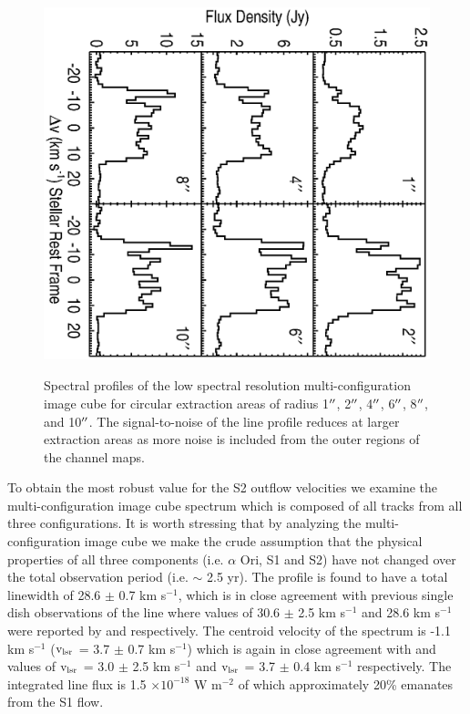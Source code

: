 \documentclass[iop]{emulateapj}
\begin{document}
\begin{figure}
\includegraphics[scale=0.75, angle=90, width=13.0cm, height=11cm, trim=20pt 50pt 20pt 40pt]{f2.eps}
\caption{Spectral profiles of the low spectral resolution multi-configuration image cube for circular extraction areas of radius 1$\mbox{$^{\prime\prime}$}$, 2$\mbox{$^{\prime\prime}$}$, 4$\mbox{$^{\prime\prime}$}$, 6$\mbox{$^{\prime\prime}$}$, 8$\mbox{$^{\prime\prime}$}$, and 10$\mbox{$^{\prime\prime}$}$. The signal-to-noise of the line profile reduces at larger extraction areas as more noise is included from the outer regions of the channel maps.}
\label{fig:fig2}
\end{figure}

To obtain the most robust value for the S2 outflow velocities we examine the multi-configuration image cube spectrum which is composed of all tracks from all three configurations. It is worth stressing that by analyzing the multi-configuration image cube we make the crude assumption that the physical properties of all three components (i.e. $\alpha$ Ori, S1 and S2) have not changed over the total observation period (i.e. $\sim$ 2.5 yr). The profile is found to have a total linewidth of 28.6 $\pm$ 0.7 km s${}^{-1}$, which is in close agreement with previous single dish observations of the line where values of 30.6 $\pm$ 2.5 km s${}^{-1}$ and 28.6 km s${}^{-1}$ were reported by \cite{1980ApJ...242L..25K} and \cite{1987ApJ...313..400H} respectively. The centroid velocity of the spectrum is  -1.1 km s${}^{-1}$ ($\rm{v_{lsr}}$ = 3.7 $\pm$ 0.7 km s${}^{-1}$) which is again in close agreement with \cite{1980ApJ...242L..25K} and \cite{1987ApJ...313..400H} values of $\rm{v_{lsr}}$ = 3.0 $\pm$ 2.5 km s${}^{-1}$ and $\rm{v_{lsr}}$ = 3.7 $\pm$ 0.4 km s${}^{-1}$ respectively. The integrated line flux is 1.5 $\times 10^{-18}$ W m$^{-2}$ of which approximately 20\% emanates from the S1 flow.
\end{document}
